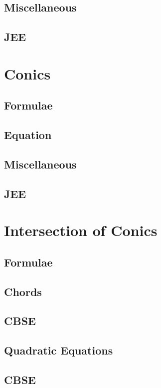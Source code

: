 \documentclass[journal]{IEEEtran}
\begin{document}
\subsection{Miscellaneous}

\subsection{JEE}

\newpage
\section{Conics}
\subsection{Formulae}

\subsection{Equation}

\subsection{Miscellaneous}

\subsection{JEE}
 
\newpage
\section{Intersection of Conics}
\subsection{Formulae}

\subsection{Chords}

\subsection{CBSE}

\subsection{Quadratic Equations}

\subsection{CBSE}

\end{document}
